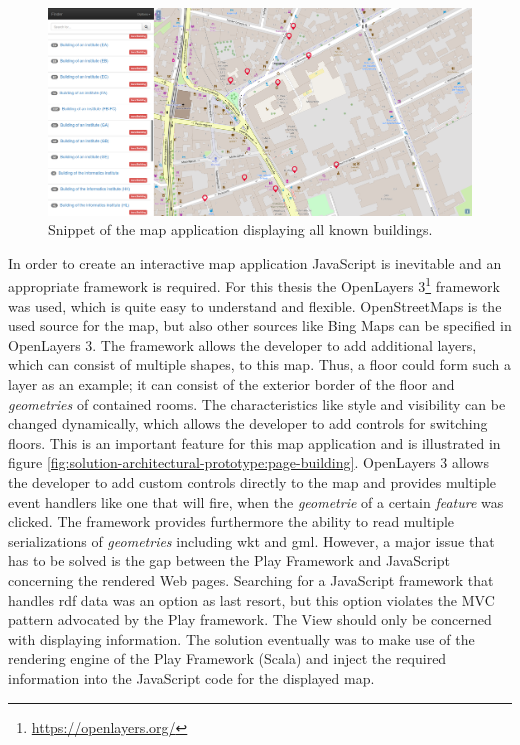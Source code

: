 \documentclass[draft,final]{vutinfth} %
\begin{document}
\begin{figure}
    \centering
    \includegraphics[width=1.0\textwidth]{graphics/solution/app/map_application.png}
    \caption{Snippet of the map application displaying all known buildings.}
    \label{fig:solution-architectural-map-app:buildings}
\end{figure}

In order to create an interactive map application JavaScript is inevitable and an appropriate framework is required. For this thesis the OpenLayers 3\footnote{\url{https://openlayers.org/}} framework was used, which is quite easy to understand and flexible. OpenStreetMaps is the used source for the map, but also other sources like Bing Maps can be specified in OpenLayers 3. The framework allows the developer to add additional layers, which can consist of multiple shapes, to this map. Thus, a floor could form such a layer as an example; it can consist of the exterior border of the floor and \textit{geometries} of contained rooms. The characteristics like style and visibility can be changed dynamically, which allows the developer to add controls for switching floors. This is an important feature for this map application and is illustrated in figure \ref{fig:solution-architectural-prototype:page-building}. OpenLayers 3 allows the developer to add custom controls directly to the map and provides multiple event handlers like one that will fire, when the \textit{geometrie} of a certain \textit{feature} was clicked. The framework provides furthermore the ability to read multiple serializations of \textit{geometries} including \gls{wkt} and \gls{gml}. However, a major issue that has to be solved is the gap between the Play Framework and JavaScript concerning the rendered Web pages. Searching for a JavaScript framework that handles \gls{rdf} data was an option as last resort, but this option violates the MVC pattern advocated by the Play framework. The View should only be concerned with displaying information. The solution eventually was to make use of the rendering engine of the Play Framework (Scala) and inject the required information into the JavaScript code for the displayed map.
\end{document}
